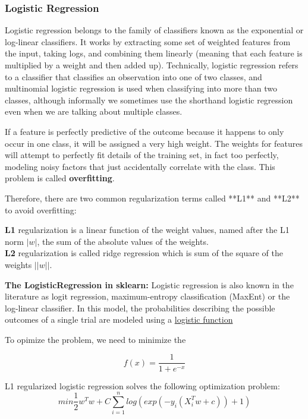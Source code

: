 \documentclass[a4paper, 12pt]{report}
\begin{document}
\subsubsection*{Logistic Regression}
Logistic regression belongs to the family of classifiers known as the exponential or log-linear classifiers. It works by extracting some set of weighted features from the input, taking logs, and combining them linearly (meaning that each feature is multiplied by a weight and then added up). Technically, logistic regression refers to a classifier that classifies an observation into one of two classes, and multinomial logistic regression is used when classifying into more than two classes, although informally we sometimes use the shorthand logistic regression even when we are talking about multiple classes.\par

\noindent If a feature is perfectly predictive of the outcome because it happens to only occur in one class, it will be assigned a very high weight. The weights for features will attempt to perfectly fit details of the training set, in fact too perfectly, modeling noisy factors that just accidentally correlate with the class. This problem is called \textbf{overfitting}.

\noindent Therefore, there are two common regularization terms called **L1** and **L2** to avoid overfitting:

\noindent \textbf{L1} regularization is a linear function of the weight values, named after the L1 norm $|w|$, the sum of the absolute values of the weights. \\
\textbf{L2} regularization is called ridge regression which is sum of the square of the weights $||w||$.

\noindent\textbf{The LogisticRegression in sklearn:}
Logistic regression is also known in the literature as logit regression, maximum-entropy classification (MaxEnt) or the log-linear classifier. In this model, the probabilities describing the possible outcomes of a single trial are modeled using a \href{https://en.wikipedia.org/wiki/Logistic_function}{logistic function} \par

\noindent To opimize the problem, we need to minimize the 

$$
f(x) = \frac 1 {1+e^{-x}}
$$

\noindent L1 regularized logistic regression solves the following optimization problem:
$$
min\frac1{2}w^Tw + C \sum_{i = 1}^n log(exp(-y_{i}(X_{i}^Tw + c)) + 1)
$$
\end{document}
